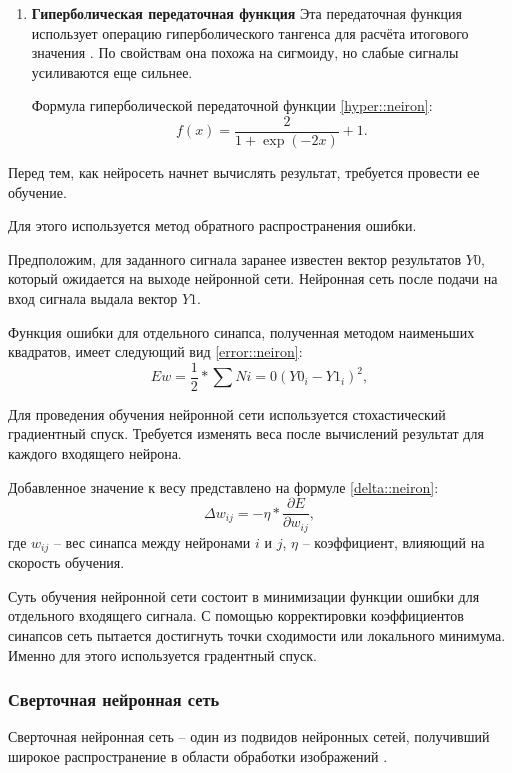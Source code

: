 \begin{enumerate}
	\item \textbf{Гиперболическая передаточная функция}
	Эта передаточная функция использует операцию гиперболического тангенса для расчёта итогового значения \cite{relu}.
	По свойствам она похожа на сигмоиду, но слабые сигналы усиливаются еще сильнее.
	
	Формула гиперболической передаточной функции \eqref{hyper::neiron}:
	\begin{equation}
		\label{hyper::neiron}
		f(x) = \frac{2}{1 + \exp(-2x)} + 1.
	\end{equation}
\end{enumerate}

Перед тем, как нейросеть начнет вычислять результат, требуется провести ее обучение.

Для этого используется метод обратного распространения ошибки.

Предположим, для заданного сигнала заранее известен вектор результатов $Y0$, который ожидается на выходе нейронной сети.
Нейронная сеть после подачи на вход сигнала выдала вектор $Y1$.

Функция ошибки для отдельного синапса, полученная методом наименьших квадратов, имеет следующий вид \eqref{error::neiron}:
\begin{equation}
	\label{error::neiron}
	E{w} = \frac{1}{2} * \sum{N}{i = 0} (Y0_i - Y1_i)^2,
\end{equation}

Для проведения обучения нейронной сети используется стохастический градиентный спуск. 
Требуется изменять веса после вычислений результат для каждого входящего нейрона.

Добавленное значение к весу представлено на формуле \eqref{delta::neiron}:
\begin{equation}
	\label{delta::neiron}
	\Delta w_{ij} = -\eta * \frac{\partial E}{\partial w_{ij}},
\end{equation}
где $w_{ij}$ -- вес синапса между нейронами $i$ и $j$, $\eta$ -- коэффициент, влияющий на скорость обучения.

Суть обучения нейронной сети состоит в минимизации функции ошибки для отдельного входящего сигнала.
С помощью корректировки коэффициентов синапсов сеть пытается достигнуть точки сходимости или локального минимума.
Именно для этого используется градентный спуск.

\subsubsection{Сверточная нейронная сеть}
Сверточная нейронная сеть -- один из подвидов нейронных сетей, получивший широкое распространение в области обработки изображений \cite{CNN_research}.

